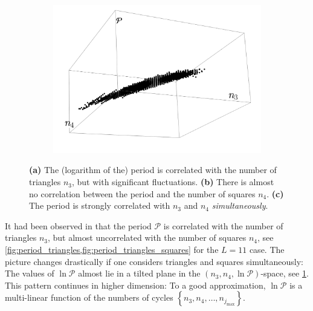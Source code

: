 \documentclass[11pt]{scrartcl}
\numberwithin{equation}{section}
\newcommand{\period}{\mathcal P}
\begin{document}
\begin{figure}[htb]
\begin{subfigure}[b]{.32 \textwidth}
		\includegraphics[width=\linewidth]{figures/period_3d}
		\subcaption{}
		\label{fig:period_cycles_3d}
	\end{subfigure}
	
	\caption{ \textbf{(a)} The (logarithm of the) period is correlated with the number of triangles $n_3$, but with significant fluctuations. \textbf{(b)} There is almost no correlation between the period and the number of squares $n_4$.  \textbf{(c)} The period is strongly correlated with $n_3$ and $n_4$ \emph{simultaneously}. }
	 	\label{fig:cycles_34}
\end{figure}

It had been observed in \cite{balduf_statistics_2023}  that the period $\period$ is correlated with the number of triangles $n_3$, but almost uncorrelated with the number of squares $n_4$, see \cref{fig:period_triangles,fig:period_triangles_squares} for the $L=11$ case. The picture changes drastically if one considers triangles and squares simultaneously: The values of $\ln \period$ almost lie in a tilted plane in the $(n_3,n_4,\ln \period)$-space, see \cref{fig:period_cycles_3d}.
This pattern continues  in higher dimension: To a good approximation, $\ln \period$ is a multi-linear function of the numbers of cycles $\left \lbrace n_3,n_4,\ldots, n_{j_\text{max}} \right \rbrace   $. 
\end{document}

